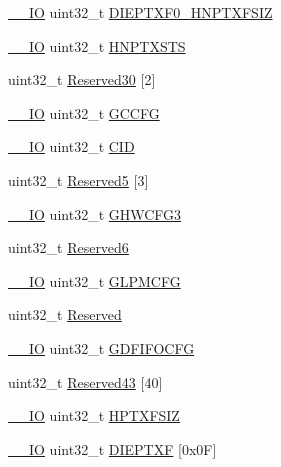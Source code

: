 \begin{DoxyCompactItemize}
\item 
\mbox{\hyperlink{core__sc300_8h_aec43007d9998a0a0e01faede4133d6be}{\+\_\+\+\_\+\+IO}} uint32\+\_\+t \mbox{\hyperlink{struct_u_s_b___o_t_g___global_type_def_a93412b352267d3faf0bd2dbac590b69e}{D\+I\+E\+P\+T\+X\+F0\+\_\+\+H\+N\+P\+T\+X\+F\+S\+IZ}}
\item 
\mbox{\hyperlink{core__sc300_8h_aec43007d9998a0a0e01faede4133d6be}{\+\_\+\+\_\+\+IO}} uint32\+\_\+t \mbox{\hyperlink{struct_u_s_b___o_t_g___global_type_def_a6ff3c8a6647ae7e5dfcd2ccfbfed4948}{H\+N\+P\+T\+X\+S\+TS}}
\item 
uint32\+\_\+t \mbox{\hyperlink{struct_u_s_b___o_t_g___global_type_def_a577856159d58c037352ee10609b2a99c}{Reserved30}} \mbox{[}2\mbox{]}
\item 
\mbox{\hyperlink{core__sc300_8h_aec43007d9998a0a0e01faede4133d6be}{\+\_\+\+\_\+\+IO}} uint32\+\_\+t \mbox{\hyperlink{struct_u_s_b___o_t_g___global_type_def_aef85efc005db9a8e37d95644e92e9032}{G\+C\+C\+FG}}
\item 
\mbox{\hyperlink{core__sc300_8h_aec43007d9998a0a0e01faede4133d6be}{\+\_\+\+\_\+\+IO}} uint32\+\_\+t \mbox{\hyperlink{struct_u_s_b___o_t_g___global_type_def_a6eefd74b3acdc3c1a88b833fcf5e8d81}{C\+ID}}
\item 
uint32\+\_\+t \mbox{\hyperlink{struct_u_s_b___o_t_g___global_type_def_ac226c147958185ec01572f0bfbc5325c}{Reserved5}} \mbox{[}3\mbox{]}
\item 
\mbox{\hyperlink{core__sc300_8h_aec43007d9998a0a0e01faede4133d6be}{\+\_\+\+\_\+\+IO}} uint32\+\_\+t \mbox{\hyperlink{struct_u_s_b___o_t_g___global_type_def_acaf5563a43c7dd8ba9b982df9581acaa}{G\+H\+W\+C\+F\+G3}}
\item 
uint32\+\_\+t \mbox{\hyperlink{struct_u_s_b___o_t_g___global_type_def_a1442a75374a2a4ca1c3d07293c780523}{Reserved6}}
\item 
\mbox{\hyperlink{core__sc300_8h_aec43007d9998a0a0e01faede4133d6be}{\+\_\+\+\_\+\+IO}} uint32\+\_\+t \mbox{\hyperlink{struct_u_s_b___o_t_g___global_type_def_a5b7c9cb9dbd528e59d39bd7e72ca6fe9}{G\+L\+P\+M\+C\+FG}}
\item 
uint32\+\_\+t \mbox{\hyperlink{struct_u_s_b___o_t_g___global_type_def_a43fae5b728aa075b9475bbe49a5738ef}{Reserved}}
\item 
\mbox{\hyperlink{core__sc300_8h_aec43007d9998a0a0e01faede4133d6be}{\+\_\+\+\_\+\+IO}} uint32\+\_\+t \mbox{\hyperlink{struct_u_s_b___o_t_g___global_type_def_ae1f4aabfcdebfaf2cdaf05a96dc0fcb7}{G\+D\+F\+I\+F\+O\+C\+FG}}
\item 
uint32\+\_\+t \mbox{\hyperlink{struct_u_s_b___o_t_g___global_type_def_aa9537ba8db767ddd1f0a4891d04a787c}{Reserved43}} \mbox{[}40\mbox{]}
\item 
\mbox{\hyperlink{core__sc300_8h_aec43007d9998a0a0e01faede4133d6be}{\+\_\+\+\_\+\+IO}} uint32\+\_\+t \mbox{\hyperlink{struct_u_s_b___o_t_g___global_type_def_a928fd38284165374eb5aa85ed8d4e6cb}{H\+P\+T\+X\+F\+S\+IZ}}
\item 
\mbox{\hyperlink{core__sc300_8h_aec43007d9998a0a0e01faede4133d6be}{\+\_\+\+\_\+\+IO}} uint32\+\_\+t \mbox{\hyperlink{struct_u_s_b___o_t_g___global_type_def_a2b783e516da93a95c56adf3e52dcbe62}{D\+I\+E\+P\+T\+XF}} \mbox{[}0x0\+F\mbox{]}
\end{DoxyCompactItemize}


